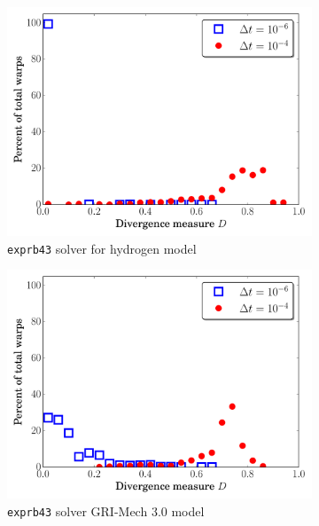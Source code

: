 \documentclass[preprint,review,11pt]{elsarticle}
\begin{document}
\begin{figure}[htbp]
\begin{subfigure}{0.49\textwidth}
      \includegraphics[width=\linewidth]{H2_exprb43_div.pdf}
      \caption{\texttt{exprb43} solver for hydrogen model}
      \label{F:exprb43_div_h2}
  \end{subfigure}
  \begin{subfigure}{0.49\textwidth}
      \includegraphics[width=\linewidth]{CH4_exprb43_div.pdf}
      \caption{\texttt{exprb43} solver GRI-Mech 3.0 model}
      \label{F:exprb43_div_ch4}
  \end{subfigure}
  \\
  \begin{subfigure}{0.49\textwidth}

\end{subfigure}
\end{figure}
\end{document}
